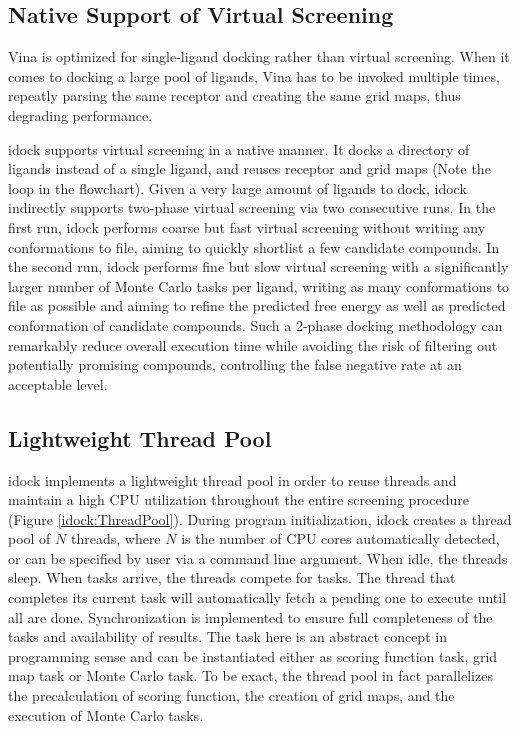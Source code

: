 \subsection{Native Support of Virtual Screening}

Vina is optimized for single-ligand docking rather than virtual screening. When it comes to docking a large pool of ligands, Vina has to be invoked multiple times, repeatly parsing the same receptor and creating the same grid maps, thus degrading performance.

idock supports virtual screening in a native manner. It docks a directory of ligands instead of a single ligand, and reuses receptor and grid maps (Note the loop in the flowchart). Given a very large amount of ligands to dock, idock indirectly supports two-phase virtual screening via two consecutive runs. In the first run, idock performs coarse but fast virtual screening without writing any conformations to file, aiming to quickly shortlist a few candidate compounds. In the second run, idock performs fine but slow virtual screening with a significantly larger number of Monte Carlo tasks per ligand, writing as many conformations to file as possible and aiming to refine the predicted free energy as well as predicted conformation of candidate compounds. Such a 2-phase docking methodology can remarkably reduce overall execution time while avoiding the risk of filtering out potentially promising compounds, controlling the false negative rate at an acceptable level.

\subsection{Lightweight Thread Pool}

idock implements a lightweight thread pool in order to reuse threads and maintain a high CPU utilization throughout the entire screening procedure (Figure \ref{idock:ThreadPool}). During program initialization, idock creates a thread pool of $N$ threads, where $N$ is the number of CPU cores automatically detected, or can be specified by user via a command line argument. When idle, the threads sleep. When tasks arrive, the threads compete for tasks. The thread that completes its current task will automatically fetch a pending one to execute until all are done. Synchronization is implemented to ensure full completeness of the tasks and availability of results. The task here is an abstract concept in programming sense and can be instantiated either as scoring function task, grid map task or Monte Carlo task. To be exact, the thread pool in fact parallelizes the precalculation of scoring function, the creation of grid maps, and the execution of Monte Carlo tasks.

